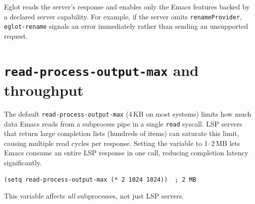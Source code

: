 Eglot reads the server's response and enables only the Emacs
features backed by a declared server capability.  For example, if
the server omits \texttt{renameProvider}, \texttt{eglot-rename}
signals an error immediately rather than sending an unsupported
request.

\section{\texttt{read-process-output-max} and throughput}

The default \texttt{read-process-output-max} (4\,KB on most systems)
limits how much data Emacs reads from a subprocess pipe in a single
\texttt{read} syscall.  LSP servers that return large completion lists
(hundreds of items) can saturate this limit, causing multiple read
cycles per response.  Setting the variable to 1--2\,MB lets Emacs
consume an entire LSP response in one call, reducing completion
latency significantly.

\begin{verbatim}
(setq read-process-output-max (* 2 1024 1024))  ; 2 MB
\end{verbatim}

This variable affects \emph{all} subprocesses, not just LSP servers.
